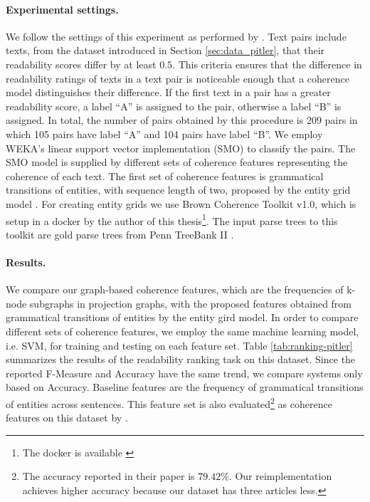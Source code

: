 \paragraph{Experimental settings.}
We follow the settings of this experiment as performed by . 
Text pairs include texts, from the dataset introduced in Section \ref{sec:data_pitler}, that their readability scores differ by at least $0.5$. 
This criteria ensures that the difference in readability ratings of texts in a text pair is noticeable enough that a coherence model distinguishes their difference. 
If the first text in a pair has a greater readability score, a label ``A'' is assigned to the pair, otherwise a label ``B'' is assigned. 
In total, the number of pairs obtained by this procedure is 209 pairs in which 105 pairs have label ``A''  and 104 pairs have label ``B''.  
We employ WEKA's linear support vector implementation (SMO) to classify the pairs.
The SMO model is supplied by different sets of coherence features representing the coherence of each text. 
The first set of coherence features is grammatical transitions of entities, with sequence length of two, proposed by the entity grid model \cite{barzilay05a,barzilay08}. 
For creating entity grids we use Brown Coherence Toolkit v1.0, which is setup in a docker by the author of this thesis\footnote{The docker is available \url{}}. 
The input parse trees to this toolkit are gold parse trees from Penn TreeBank II \cite{marcus94}. 

\paragraph{Results.}
We compare our graph-based coherence features, which are the frequencies of \mbox{k-node} subgraphs in projection graphs, with the proposed features obtained from grammatical transitions of entities by the entity gird model. 
In order to compare different sets of coherence features, we employ the same machine learning model, i.e. SVM, for training and testing on each feature set. 
Table \ref{tab:ranking-pitler} summarizes the results of the readability ranking task on this dataset. 
Since the reported F-Measure and Accuracy have the same trend, we compare systems only based on Accuracy.  
Baseline features are the frequency of grammatical transitions of entities across sentences. 
This feature set is also evaluated\footnote{The accuracy reported in their paper is $79.42\%$. Our reimplementation achieves higher accuracy because our dataset has three articles less.} as coherence features on this dataset by .

